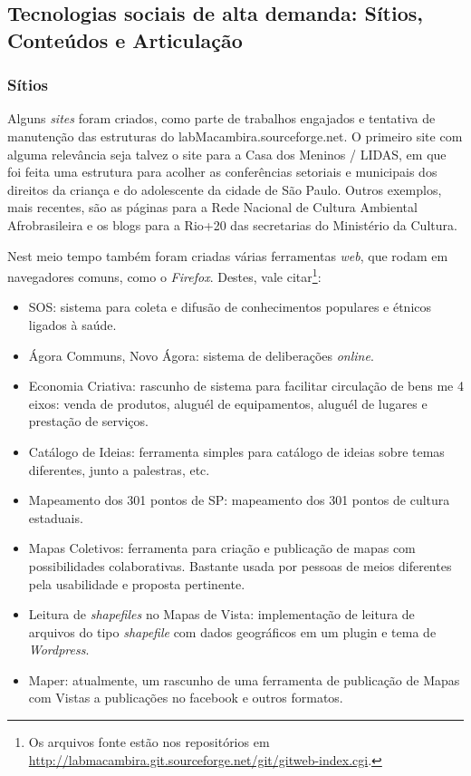    \subsection{Tecnologias sociais de alta demanda: Sítios, Conteúdos e Articulação}

      \subsubsection{Sítios}

        Alguns \emph{sites} foram criados, como parte de trabalhos engajados e tentativa de manutenção das estruturas do labMacambira.sourceforge.net. O primeiro site com alguma relevância seja talvez o site para a Casa dos Meninos / LIDAS, em que foi feita uma estrutura para acolher as conferências setoriais e municipais dos direitos da criança e do adolescente da cidade de São Paulo. Outros exemplos, mais recentes, são as páginas para a Rede Nacional de Cultura Ambiental Afrobrasileira e os blogs para a Rio+20 das secretarias do Ministério da Cultura.

        Nest meio tempo também foram criadas várias ferramentas \emph{web}, que rodam em navegadores comuns, como o \emph{Firefox}. Destes, vale citar\footnote{Os arquivos fonte estão nos repositórios em \url{http://labmacambira.git.sourceforge.net/git/gitweb-index.cgi}.}:
\begin{itemize}
    \item SOS: sistema para coleta e difusão de conhecimentos populares e étnicos ligados à saúde.
    \item Ágora Communs, Novo Ágora: sistema de deliberações \emph{online}.
    \item Economia Criativa: rascunho de sistema para facilitar circulação de bens me 4 eixos: venda de produtos, aluguél de equipamentos, aluguél de lugares e prestação de serviços.
    \item Catálogo de Ideias: ferramenta simples para catálogo de ideias sobre temas diferentes, junto a palestras, etc.
    \item Mapeamento dos 301 pontos de SP: mapeamento dos 301 pontos de cultura estaduais.
    \item Mapas Coletivos: ferramenta para criação e publicação de mapas com possibilidades colaborativas. Bastante usada por pessoas de meios diferentes pela usabilidade e proposta pertinente.
    \item Leitura de \emph{shapefiles} no Mapas de Vista: implementação de leitura de arquivos do tipo \emph{shapefile} com dados geográficos em um plugin e tema de \emph{Wordpress}.
    \item Maper: atualmente, um rascunho de uma ferramenta de publicação de Mapas com Vistas a publicações no facebook e outros formatos.
\end{itemize}

